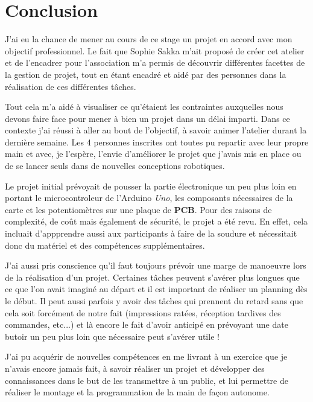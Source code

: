 \newpage

\section{Conclusion}

J'ai eu la chance de mener au cours de ce stage un projet en accord avec mon objectif professionnel. Le fait que Sophie Sakka m'ait proposé de créer cet atelier et de l'encadrer pour l'association m'a permis de découvrir différentes facettes de la gestion de projet, tout en étant encadré et aidé par des personnes dans la réalisation de ces différentes tâches.

\vspace{0.5cm}
Tout cela m'a aidé à visualiser ce qu'étaient les contraintes auxquelles nous devons faire face pour mener à bien un projet dans un délai imparti. Dans ce contexte j'ai réussi à aller au bout de l'objectif, à savoir animer l'atelier durant la dernière semaine. Les 4 personnes inscrites ont toutes pu repartir avec leur propre main et avec, je l'espère, l'envie d'améliorer le projet que j'avais mis en place ou de se lancer seuls dans de nouvelles conceptions robotiques.


\vspace{0.5cm}
Le projet initial prévoyait de pousser la partie électronique un peu plus loin en portant le microcontroleur de l'Arduino \textit{Uno}, les composants nécessaires de la carte et les potentiomètres sur une plaque de \textbf{PCB}. Pour des raisons de complexité, de coût mais également de sécurité, le projet a été revu. En effet, cela incluait d'appprendre aussi aux participants à faire de la soudure et nécessitait donc du matériel et des compétences supplémentaires.

\vspace{0.5cm}
J'ai aussi pris conscience qu'il faut toujours prévoir une marge de manoeuvre lors de la réalisation d'un projet. Certaines tâches peuvent s'avérer plus longues que ce que l'on avait imaginé au départ et il est important de réaliser un planning dès le début. Il peut aussi parfois y avoir des tâches qui prennent du retard sans que cela soit forcément de notre fait (impressions ratées, réception tardives des commandes, etc...) et là encore le fait d'avoir anticipé en prévoyant une date butoir un peu plus loin que nécessaire peut s'avérer utile !

\vspace{0.5cm}
J'ai pu acquérir de nouvelles compétences en me livrant à un exercice que je n'avais encore jamais fait, à savoir réaliser un projet et développer des connaissances dans le but de les transmettre à un public, et lui permettre de réaliser le montage et la programmation de la main de façon autonome. 

